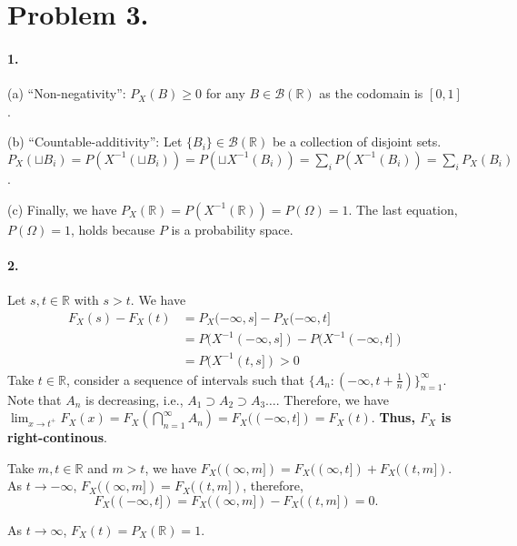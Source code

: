 \documentclass[11pt]{article}
\theoremstyle{definition}
\theoremstyle{boldtitle} %
\numberwithin{equation}{section}
\numberwithin{figure}{section}
\numberwithin{table}{section}
\begin{document}
\begin{figure}[htbp]
  \centering
\end{figure}

\section*{Problem 3.} 
\paragraph{1.} (a) ``Non-negativity'': $P_X (B) \geq 0$ for any $B \in \mathcal{B}(\mathbb{R})$ as the codomain is $[0,1]$.

(b) ``Countable-additivity'': Let $\{B_i\} \in \mathcal{B}(\mathbb{R})$ be a collection of disjoint sets.
$P_X (\sqcup B_i) = P(X^{-1} (\sqcup B_i) ) = P(\sqcup X^{-1} (B_i) ) = \sum_i P(X^{-1} (B_i) ) = \sum_i P_X(B_i)$.

(c) Finally, we have $P_X (\mathbb{R}) = P(X^{-1} (\mathbb{R})) = P(\Omega) = 1$.
The last equation, $P(\Omega) = 1$, holds because $P$ is a probability space.


\paragraph{2.} 
Let $s, t \in \mathbb{R}$ with $s > t$.
We have 
\begin{align*}
  F_X(s) - F_X(t) & = P_X(-\infty, s] - P_X(-\infty, t] \\ 
    & = P(X^{-1}(-\infty, s]) - P(X^{-1}(-\infty, t]) \\ 
    & = P(X^{-1}(t, s]) > 0
\end{align*}
Take $t \in \mathbb{R}$, consider a sequence of intervals such that 
$\{A_n: (-\infty, t + \frac{1}{n}) \}_{n=1}^\infty$.
Note that $A_n$ is decreasing, i.e., $A_1 \supset A_2 \supset A_3 \ldots$.
Therefore, we have $\lim_{x \rightarrow t^+} F_X(x) = F_X(\bigcap_{n=1}^\infty A_n) = F_X((-\infty, t]) = F_X(t)$.
\textbf{Thus, $F_X$ is right-continous}.

Take $m, t \in \mathbb{R}$ and $ m > t$, we have $F_X((\infty, m]) = F_X((\infty, t]) + F_X((t, m])$.
As $t \rightarrow -\infty$, $F_X((\infty, m]) = F_X((t, m])$,
therefore, 
\[
F_X((-\infty, t]) = F_X((\infty, m]) - F_X((t, m]) = 0.
\]

As $t \rightarrow \infty$, $F_X(t) = P_X(\mathbb{R}) = 1$.

\end{document}
